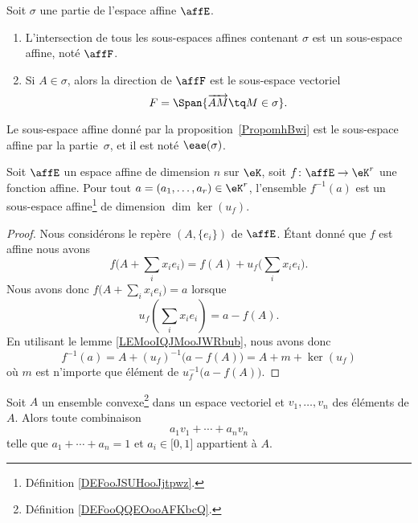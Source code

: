 \begin{proposition}      \label{PropomhBwi}
	Soit \( \sigma\) une partie de l'espace affine \( \affE\).
	\begin{enumerate}
		\item
		      L'intersection de tous les sous-espaces affines contenant \( \sigma\) est un sous-espace affine, noté \( \affF\).
		\item
		      Si \( A\in \sigma\), alors la direction de \( \affF\) est le sous-espace vectoriel
		      \begin{equation}        \label{EqnRAUfg}
			      F=\Span\{ \overrightarrow{ AM }\tq M\in \sigma \}.
		      \end{equation}
	\end{enumerate}
\end{proposition}
Le sous-espace affine donné par la proposition~\ref{PropomhBwi} est le sous-espace affine  par la partie~\( \sigma\), et il est noté \( \eae(\sigma)\). 

\begin{proposition}     \label{PROPooAKJBooMkmsiV}
	Soit \( \affE\) un espace affine de dimension \( n\) sur \( \eK\), soit \( f\colon \affE\to \eK^r\) une fonction affine. Pour tout \( a=(a_1,\ldots, a_r)\in \eK^r\), l'ensemble \( f^{-1}(a)\) est un sous-espace affine\footnote{Définition \ref{DEFooJSUHooJjtpwz}.} de dimension \( \dim\ker(u_f)\).
\end{proposition}

\begin{proof}
	Nous considérons le repère \( (A,\{ e_i \})\) de \( \affE\). Étant donné que \( f\) est affine nous avons
	\begin{equation}
		f\big( A+\sum_ix_ie_i \big)=f(A)+u_f\big( \sum_ix_ie_i \big).
	\end{equation}
	Nous avons donc \( f\big( A+\sum_ix_ie_i \big)=a\) lorsque
	\begin{equation}
		u_f(\sum_ix_ie_i)=a-f(A).
	\end{equation}
	En utilisant le lemme \ref{LEMooIQJMooJWRbub}, nous avons donc
	\begin{equation}
		f^{-1}(a)=A+(u_f)^{-1}\big( a-f(A) \big)=A+m+\ker(u_f)
	\end{equation}
	où \( m\) est n'importe que élément de \( u_f^{-1}\big(a-f(A)\big)\).
\end{proof}

\begin{proposition}     \label{PropPoNpPz}
	Soit \( A\) un ensemble convexe\footnote{Définition \ref{DEFooQQEOooAFKbcQ}.} dans un espace vectoriel et \( v_1,\ldots, v_n\) des éléments de \( A\). Alors toute combinaison
	\begin{equation}
		a_1v_1+\cdots +a_nv_n
	\end{equation}
	telle que \( a_1+\cdots +a_n=1\) et \( a_i\in\mathopen[ 0 , 1 \mathclose]\) appartient à \( A\).
\end{proposition}

